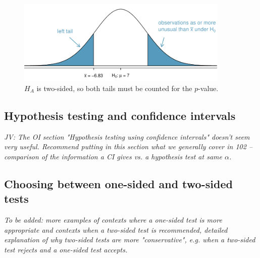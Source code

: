 \begin{spacing}{1.5}
\begin{figure}[h]
	\centering
	\includegraphics[width=0.9\textwidth]
	{ch_inference_foundations_oi_biostat/figures/2ndSchSleepHTExample/2ndSchSleepHTExample}
	\caption{$H_A$ is two-sided, so both tails must be counted for the $p$-value.}
	\label{2ndSchSleepHTExample}
\end{figure}	
	

\subsection{Hypothesis testing and confidence intervals}

\textit{JV: The OI section "Hypothesis testing using confidence intervals" doesn't seem very useful. Recommend putting in this section what we generally cover in 102 -- comparison of the information a CI gives vs. a hypothesis test at same $\alpha$.}

\vspace{3cm}

\subsection{Choosing between one-sided and two-sided tests}

\textit{To be added: more examples of contexts where a one-sided test is more appropriate and contexts when a two-sided test is recommended, detailed explanation of why two-sided tests are more "conservative", e.g. when a two-sided test rejects and a one-sided test accepts.} 



\end{spacing}
